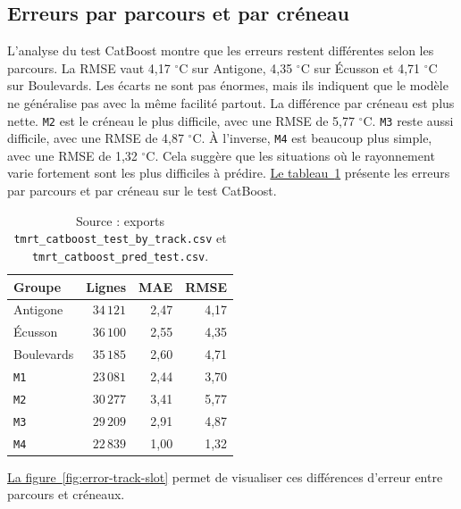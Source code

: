 \documentclass{article}
\begin{document}
\subsection{Erreurs par parcours et par créneau}

L'analyse du test CatBoost montre que les erreurs restent différentes selon les parcours. La RMSE vaut 4,17 \(^{\circ}\mathrm{C}\) sur Antigone, 4,35 \(^{\circ}\mathrm{C}\) sur Écusson et 4,71 \(^{\circ}\mathrm{C}\) sur Boulevards. Les écarts ne sont pas énormes, mais ils indiquent que le modèle ne généralise pas avec la même facilité partout. La différence par créneau est plus nette. \texttt{M2} est le créneau le plus difficile, avec une RMSE de 5,77 \(^{\circ}\mathrm{C}\). \texttt{M3} reste aussi difficile, avec une RMSE de 4,87 \(^{\circ}\mathrm{C}\). À l'inverse, \texttt{M4} est beaucoup plus simple, avec une RMSE de 1,32 \(^{\circ}\mathrm{C}\). Cela suggère que les situations où le rayonnement varie fortement sont les plus difficiles à prédire. \hyperref[tab:catboost-erreurs-groupes]{Le tableau~\ref{tab:catboost-erreurs-groupes}} présente les erreurs par parcours et par créneau sur le test CatBoost.

\begin{table}[H]
\centering
\small
\begin{tabular}{lrrr}
\toprule
Groupe & Lignes & MAE & RMSE \\
\midrule
Antigone & \(34\,121\) & 2,47 & 4,17 \\
Écusson & \(36\,100\) & 2,55 & 4,35 \\
Boulevards & \(35\,185\) & 2,60 & 4,71 \\
\texttt{M1} & \(23\,081\) & 2,44 & 3,70 \\
\texttt{M2} & \(30\,277\) & 3,41 & 5,77 \\
\texttt{M3} & \(29\,209\) & 2,91 & 4,87 \\
\texttt{M4} & \(22\,839\) & 1,00 & 1,32 \\
\bottomrule
\end{tabular}
\caption{Erreurs CatBoost selon le parcours et le créneau.}
\label{tab:catboost-erreurs-groupes}
\vspace{-0.35cm}
\caption*{\footnotesize Source : exports \texttt{tmrt\_catboost\_test\_by\_track.csv} et \texttt{tmrt\_catboost\_pred\_test.csv}.}
\end{table}

\hyperref[fig:error-track-slot]{La figure~\ref{fig:error-track-slot}} permet de visualiser ces différences d'erreur entre parcours et créneaux.
\end{document}
